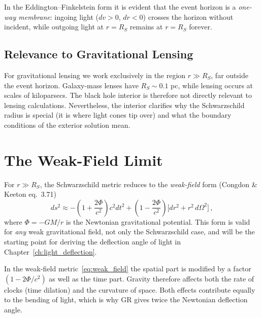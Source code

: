 \begin{remark}
In the Eddington--Finkelstein form it is evident that the event
horizon is a \emph{one-way membrane}: ingoing light ($dv > 0$,
$dr < 0$) crosses the horizon without incident, while outgoing light
at $r = R_S$ remains at $r = R_S$ forever.
\end{remark}

\subsection{Relevance to Gravitational Lensing}
\label{sec:dg_interior_relevance}

\begin{remark}
For gravitational lensing we work exclusively in the region
$r \gg R_S$, far outside the event horizon.  Galaxy-mass lenses
have $R_S \sim 0.1$ pc, while lensing occurs at scales of kiloparsecs.
The black hole interior is therefore not directly relevant to lensing
calculations.  Nevertheless, the interior clarifies
why the Schwarzschild radius is special (it is where light
cones tip over) and what the boundary
conditions of the exterior solution mean.
\end{remark}


\section{The Weak-Field Limit}
\label{sec:weak_field}

For $r \gg R_S$, the Schwarzschild metric reduces to the \emph{weak-field}
form (Congdon \& Keeton eq.~3.71)
\begin{equation}
    ds^2 \approx -\left(1 + \frac{2\Phi}{c^2}\right) c^2 dt^2
    + \left(1 - \frac{2\Phi}{c^2}\right)
    \bigl[dr^2 + r^2\, d\Omega^2\bigr] \,,
    \label{eq:weak_field}
\end{equation}
where $\Phi = -GM/r$ is the Newtonian gravitational potential.  This
form is valid for \emph{any} weak gravitational field, not only the
Schwarzschild case, and will be the starting point for deriving the
deflection angle of light in Chapter~\ref{ch:light_deflection}.

\begin{remark}
In the weak-field metric~\eqref{eq:weak_field}
the spatial part is modified by a factor $(1 - 2\Phi/c^2)$ as well as
the time part.  Gravity therefore affects both the rate
of clocks (time dilation) and the curvature of space.
Both effects contribute equally to the bending of light, which is why
GR gives twice the Newtonian deflection angle.
\end{remark}


